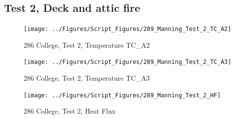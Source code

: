 \documentclass[12pt,oneside]{book}
\begin{document}
\clearpage


\subsection{Test 2, Deck and attic fire}

\begin{figure}[!ht]
\texttt{[image: ../Figures/Script\_Figures/289\_Manning\_Test\_2\_TC\_A2]}
\caption{286 College, Test 2, Temperature TC\_A2}
\label{fig:289_Manning_Test_2_TC_A2}
\end{figure}

\begin{figure}[!ht]
\texttt{[image: ../Figures/Script\_Figures/289\_Manning\_Test\_2\_TC\_A3]}
\caption{286 College, Test 2, Temperature TC\_A3}
\label{fig:289_Manning_Test_2_TC_A3}
\end{figure}

\begin{figure}[!ht]
\texttt{[image: ../Figures/Script\_Figures/289\_Manning\_Test\_2\_HF]}
\caption{286 College, Test 2, Heat Flux}
\label{fig:289_Manning_Test_2_HF}
\end{figure}
\end{document}
